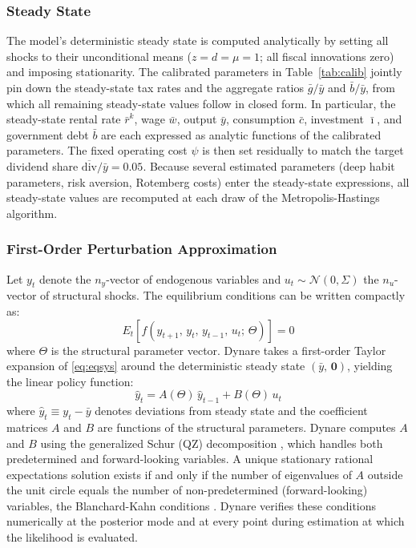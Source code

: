 \documentclass[article,11pt,letterpaper,fleqn]{article}
\theoremstyle{definition}
\numberwithin{equation}{section}
\begin{document}
\subsubsection{Steady State}

The model's deterministic steady state is computed analytically by setting all shocks to their unconditional means ($z = d = \mu = 1$; all fiscal innovations zero) and imposing stationarity. The calibrated parameters in Table~\ref{tab:calib} jointly pin down the steady-state tax rates and the aggregate ratios $\bar{g}/\bar{y}$ and $\bar{b}/\bar{y}$, from which all remaining steady-state values follow in closed form. In particular, the steady-state rental rate $\bar{r}^k$, wage $\bar{w}$, output $\bar{y}$, consumption $\bar{c}$, investment $\bar{\imath}$, and government debt $\bar{b}$ are each expressed as analytic functions of the calibrated parameters. The fixed operating cost $\psi$ is then set residually to match the target dividend share $\overline{\text{div}}/\bar{y} = 0.05$. Because several estimated parameters (deep habit parameters, risk aversion, Rotemberg costs) enter the steady-state expressions, all steady-state values are recomputed at each draw of the Metropolis-Hastings algorithm.

\subsubsection{First-Order Perturbation Approximation}

Let $y_t$ denote the $n_y$-vector of endogenous variables and $u_t \sim \mathcal{N}(0,\Sigma)$ the $n_u$-vector of structural shocks. The equilibrium conditions can be written compactly as:
\begin{equation}\label{eq:eqsys}
E_t\!\left[f\!\left(y_{t+1},\, y_t,\, y_{t-1},\, u_t;\, \Theta\right)\right] = 0
\end{equation}
where $\Theta$ is the structural parameter vector. Dynare takes a first-order Taylor expansion of \eqref{eq:eqsys} around the deterministic steady state $(\bar{y},\,\mathbf{0})$, yielding the linear policy function:
\begin{equation}\label{eq:policy}
\hat{y}_t = A(\Theta)\,\hat{y}_{t-1} + B(\Theta)\,u_t
\end{equation}
where $\hat{y}_t \equiv y_t - \bar{y}$ denotes deviations from steady state and the coefficient matrices $A$ and $B$ are functions of the structural parameters. Dynare computes $A$ and $B$ using the generalized Schur (QZ) decomposition \cite{Klein_2000}, which handles both predetermined and forward-looking variables. A unique stationary rational expectations solution exists if and only if the number of eigenvalues of $A$ outside the unit circle equals the number of non-predetermined (forward-looking) variables, the Blanchard-Kahn conditions \cite{Blanchard_Kahn_1980}. Dynare verifies these conditions numerically at the posterior mode and at every point during estimation at which the likelihood is evaluated.
\end{document}
